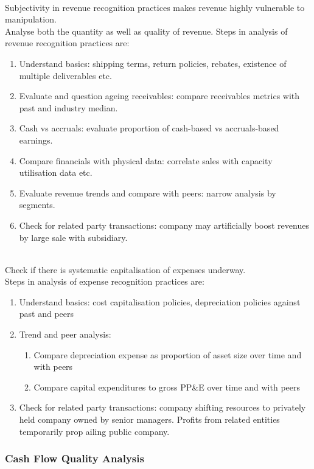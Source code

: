 \begin{remark} \\
Subjectivity in revenue recognition practices makes revenue highly vulnerable to manipulation.\\
Analyse both the quantity as well as quality of revenue.
Steps in analysis of revenue recognition practices are:
\begin{enumerate}[label=\roman*.]
\setlength{\itemsep}{0pt}
\item Understand basics: shipping terms, return policies, rebates, existence of multiple deliverables etc.
\item Evaluate and question ageing receivables: compare receivables metrics with past and industry median.
\item Cash vs accruals: evaluate proportion of cash-based vs accruals-based earnings.
\item Compare financials with physical data: correlate sales with capacity utilisation data etc.
\item Evaluate revenue trends and compare with peers: narrow analysis by segments.
\item Check for related party transactions: company may artificially boost revenues by large sale with subsidiary.
\end{enumerate}
\end{remark}

\begin{remark} \\
Check if there is systematic capitalisation of expenses underway.\\
Steps in analysis of expense recognition practices are:
\begin{enumerate}[label=\roman*.]
\setlength{\itemsep}{0pt}
\item Understand basics: cost capitalisation policies, depreciation policies against past and peers
\item Trend and peer analysis:
\begin{enumerate}[label=\arabic*.]
\setlength{\itemsep}{0pt}
\item Compare depreciation expense as proportion of asset size over time and with peers
\item Compare capital expenditures to gross PP&E over time and with peers
\end{enumerate}
\item Check for related party transactions: company shifting resources to privately held company owned by senior managers. Profits from related entities temporarily prop ailing public company.
\end{enumerate}
\end{remark}

\subsubsection{Cash Flow Quality Analysis}

\begin{remark} \hlt{}
\end{remark}


